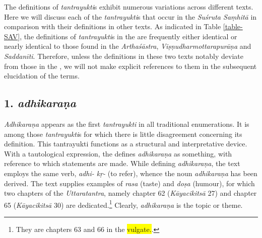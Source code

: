 The definitions of \emph{tantrayukti}s exhibit numerous variations across different texts. Here we will discuss each of the \emph{tantrayukti}s that occur in the \emph{Suśruta Saṃhitā} in comparison with their definitions in other texts. As indicated in Table \ref{table-SAV}, the definitions of \emph{tantrayukti}s in the \SS are frequently either identical or nearly identical to those found in the \emph{Arthaśāstra}, \emph{Viṣṇudharmottarapurāṇa} and \emph{Saddanīti}. Therefore, unless the definitions in these two texts notably deviate from those in the \SS, we will not make explicit references to them in the subsequent elucidation of the terms. 


\subsection{1. \emph{adhikaraṇa}}

\emph{Adhikaraṇa} appears as the first \emph{tantrayukti} in all traditional enumerations. It is among those \emph{tantrayukti}s for which there is little disagreement concerning its definition. This tantrayukti functions as a structural and interpretative device. With a tautological expression, the \SS defines \emph{adhikaraṇa} as something, with reference to which statements are made. While defining \emph{adhikaraṇa}, the text employs the same verb, \emph{adhi- kṛ-} (to refer), whence the noun \emph{adhikaraṇa} has been derived. The text supplies examples of \emph{rasa} (taste) and \emph{doṣa} (humour), for which two chapters of the \emph{Uttaratantra}, namely chapter 62 (\emph{Kāyacikitsā} 27) and  chapter 65 (\emph{Kāyacikitsā} 30) are dedicated.\footnote{They are chapters 63 and 66 in the \colorbox{yellow}{vulgate.}.} Clearly, \emph{adhikaraṇa} is the topic or theme. 

